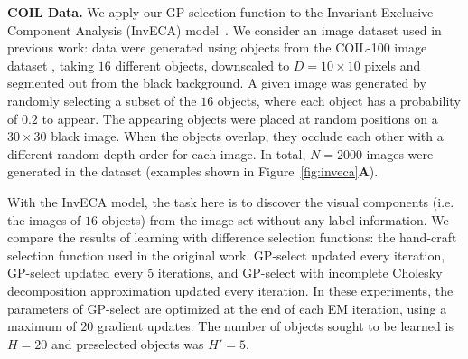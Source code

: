 
\textbf{COIL Data.}
We apply our GP-selection function to the Invariant Exclusive Component Analysis (InvECA) model~\citep{DaiEtAl2013}.
We consider an image dataset used in previous work: data were generated using objects from the COIL-100 image dataset \citep{coil100}, taking $16$ different objects, downscaled to $D=10 \times 10$ pixels and segmented out from the black background.
A given image was generated by randomly selecting a subset of the $16$ objects, where each object has a probability of $0.2$ to appear.
The appearing objects were placed at random positions on a $30 \times 30$ black image.
When the objects overlap, they occlude each other with a different random depth order for each image.
In total, $N=2000$ images were generated in the dataset (examples shown in Figure~\ref{fig:inveca}\textbf{A}).

With the InvECA model, the task here is to discover the visual components (i.e. the images of $16$ objects) from the image set without any label information. We compare the results of learning with difference selection functions: the hand-craft selection function used in the original work, GP-select updated every iteration, GP-select updated every 5 iterations, and GP-select with incomplete Cholesky decomposition approximation updated every iteration. In these experiments, the parameters of GP-select are optimized at the end of each EM iteration, using a maximum of $20$ gradient updates.
The number of objects sought to be learned is $H=20$ and preselected objects was $H'=5$.

